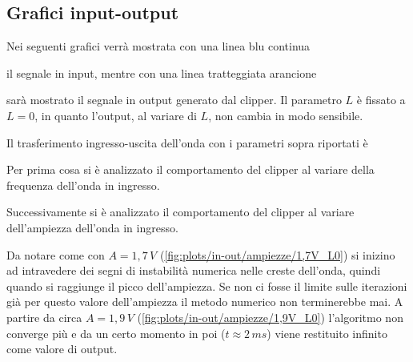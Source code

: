 		\subsection{Grafici input-output}
			\label{graphs:input-output}
			Nei seguenti grafici verrà mostrata con una linea blu continua
			il segnale in \textcolor{matlab_blue}{input}, mentre con una linea tratteggiata arancione
			sarà mostrato il segnale in \textcolor{matlab_orange}{output} generato dal clipper. Il parametro $L$ è fissato a $L = 0$, in quanto l'output, al variare di $L$, non cambia in modo sensibile.
		
			Il trasferimento ingresso-uscita dell'onda con i parametri sopra riportati è
			\pagebreak
		
			Per prima cosa si è analizzato il comportamento del clipper al variare della frequenza dell'onda in ingresso.
			\graficospace
			\graficospace
			\pagebreak
		
			Successivamente si è analizzato il comportamento del clipper al variare dell'ampiezza dell'onda in ingresso.
			\graficospace
			\graficospace
			\graficospace
			
			Da notare come con $A = 1,7\,V$ (\ref{fig:plots/in-out/ampiezze/1,7V_L0}) si inizino ad intravedere dei segni di instabilità numerica nelle creste dell'onda, quindi quando si raggiunge il picco dell'ampiezza. Se non ci fosse il limite sulle iterazioni già per questo valore dell'ampiezza il metodo numerico non terminerebbe mai. A partire da circa $A = 1,9\,V$ (\ref{fig:plots/in-out/ampiezze/1,9V_L0}) l'algoritmo non converge più e da un certo momento in poi ($t \approx 2\,ms$) viene restituito infinito come valore di output.
			\pagebreak
			
